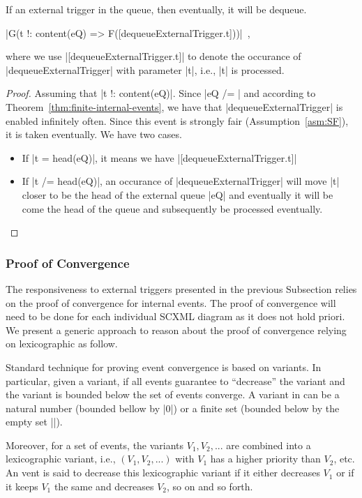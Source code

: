 \begin{theorem}
  If an external trigger in the queue, then eventually, it will be dequeue.
  \begin{center}
    |G(t !: content(eQ) => F([dequeueExternalTrigger.t]))|~,
  \end{center}
  where we use |[dequeueExternalTrigger.t]| to denote the occurance of
  |dequeueExternalTrigger| with parameter |t|, i.e., |t| is processed.
\end{theorem}
\begin{proof}
  Assuming that |t !: content(eQ)|. Since |eQ /= {}| and according to
  Theorem~\ref{thm:finite-internal-events}, we have that
  |dequeueExternalTrigger| is enabled infinitely often.  Since this
  event is strongly fair (Assumption~\ref{asm:SF}), it is taken
  eventually. We have two cases.
  \begin{itemize}
  \item If |t = head(eQ)|, it means we have
    |[dequeueExternalTrigger.t]|
    
  \item If |t /= head(eQ)|, an occurance of |dequeueExternalTrigger|
    will move |t| closer to be the head of the external queue |eQ| and
    eventually it will be come the head of the queue and subsequently
    be processed eventually.
  \end{itemize}
\end{proof}

\subsubsection{Proof of Convergence}
\label{sec:proof-convergence}
The responsiveness to external triggers presented in the previous
Subsection relies on the proof of convergence for internal events. The
proof of convergence will need to be done for each individual SCXML
diagram as it does not hold priori.  We present a generic approach to
reason about the proof of convergence relying on lexicographic as
follow.

Standard technique for proving event convergence is based on
variants.  In particular, given a variant, if all events guarantee to
``decrease'' the variant and the variant is bounded below the set of
events converge.  A variant in \EventB can be a natural number
(bounded bellow by |0|) or a finite set (bounded below by the empty
set |{}|).

Moreover, for a set of events, the variants $V_1, V_2, ...$ are combined into a
lexicographic variant, i.e., $(V_1, V_2, ...)$ with $V_1$ has a higher
priority than $V_2$, etc. An vent is said to decrease this
lexicographic variant if it either decreases $V_1$ or if it keeps
$V_1$ the same and decreases $V_2$, so on and so forth.


